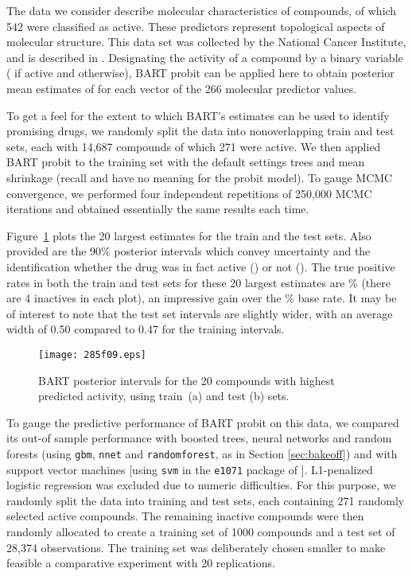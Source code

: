 \documentclass[aoas,nameyear,dvips]{arximspdf}
\newcommand{\citeasnoun}[1]{\citet{#1}}
\begin{document}
The data we consider describe  molecular characteristics
of  compounds, of which 542 were classified as active.
These predictors represent topological aspects of molecular structure.
This data set was collected by the National Cancer Institute, and is
described in \citeasnoun{Feng2003}.  Designating the activity of a compound
by a binary variable ( if active and  otherwise), BART probit can be applied here
to obtain posterior mean estimates of   for each  vector of the 266
molecular predictor values.

To get a feel for the extent to which BART's   estimates
can be used to identify promising drugs, we randomly split the data
into nonoverlapping train and test sets, each with 14,687 compounds of
which 271 were active.  We then applied BART probit to the training set
with the default settings  trees and mean shrinkage 
(recall  and  have no meaning for the probit model).  To gauge
MCMC convergence, we performed four independent repetitions of 250,000
MCMC iterations and obtained essentially the same results each time.

Figure~\ref{intervals} plots the 20 largest   estimates
for the train and the test sets.  Also provided are the 90\% posterior
intervals which convey uncertainty and the identification whether the
drug was in fact active () or not ().  The true positive
rates in both the train and test sets for these 20 largest estimates
are \% (there are 4 inactives in each plot), an impressive
gain over the \% base rate.  It may be of interest to
note that the test set intervals are slightly wider, with an average
width of 0.50 compared to 0.47 for the training intervals.

\begin{figure}

\texttt{[image: 285f09.eps]}

\caption{BART posterior intervals for the 20 compounds with highest
predicted activity, using train~\textup{(a)} and test \textup{(b)} sets.}\label{intervals}
\end{figure}


To gauge the predictive performance of BART probit on this data, we
compared its out-of sample performance with  boosted trees, neural
networks and random forests (using \texttt{gbm}, \texttt{nnet} and
\texttt{randomforest}, as in Section \ref{sec:bakeoff}) and with
support vector machines [using \texttt{svm} in the \texttt{e1071}
package of \citeasnoun{e1071}].  L1-penalized logistic regression was
excluded due to numeric difficulties.   For this purpose, we randomly
split the data into training and test sets, each containing 271
randomly selected active compounds.  The remaining inactive compounds
were then randomly allocated to create a training set of 1000 compounds
and a test set of 28,374 observations.  The training set was
deliberately chosen smaller to make feasible a comparative experiment
with 20 replications.
\end{document}
